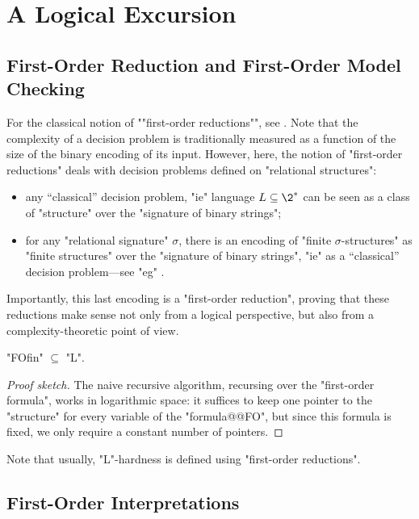 \section{A Logical Excursion}
\label{sec:preliminaries-automatic-structures-logic}

\subsection{First-Order Reduction and First-Order Model Checking}

For the classical notion of \AP""first-order reductions"", see
\cite[Definition 2.11 \& Definition 1.26]{Immerman1998DescriptiveComplexity}.
Note that the complexity of a decision problem is traditionally measured
as a function of the size of the binary encoding of its input.
However, here, the notion of "first-order reductions" deals with
decision problems defined on "relational structures":
\begin{itemize}
	\item any ``classical'' decision problem, "ie" language $L \subseteq \2^*$
		can be seen as a class of "structure" over the "signature of binary strings";
	\item for any "relational signature" $\sigma$,
		there is an encoding of "finite $\sigma$-structures" as "finite structures"
		over the "signature of binary strings", "ie" as a ``classical''
		decision problem---see "eg" \cite[\S~2.2]{Immerman1998DescriptiveComplexity}.
\end{itemize}
Importantly, this last encoding is a "first-order reduction", proving that these reductions
make sense not only from a logical perspective, but also from a complexity-theoretic point of
view.

\begin{proposition}[Folklore]
	\label{prop:FO-in-L}
	"FOfin" $\subseteq$ "L".
\end{proposition}

\begin{proof}[Proof sketch]
	The naive recursive algorithm, recursing over the "first-order formula",
	works in logarithmic space: it suffices to keep one pointer to the "structure"
	for every variable of the "formula@@FO", but since this formula is fixed, we only
	require a constant number of pointers.
\end{proof}

Note that usually, "L"-hardness is defined using "first-order reductions".


\subsection{First-Order Interpretations}

